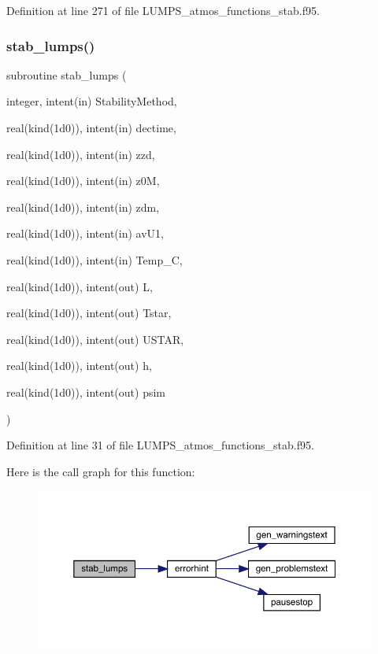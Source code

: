 Definition at line 271 of file L\+U\+M\+P\+S\+\_\+atmos\+\_\+functions\+\_\+stab.\+f95.

\mbox{\label{_l_u_m_p_s__atmos__functions__stab_8f95_a1783dde883ce9c28084bad6ce0af4b7d}} 
\subsubsection{\texorpdfstring{stab\+\_\+lumps()}{stab\_lumps()}}
{\footnotesize\ttfamily subroutine stab\+\_\+lumps (\begin{DoxyParamCaption}\item[{integer, intent(in)}]{Stability\+Method,  }\item[{real(kind(1d0)), intent(in)}]{dectime,  }\item[{real(kind(1d0)), intent(in)}]{zzd,  }\item[{real(kind(1d0)), intent(in)}]{z0M,  }\item[{real(kind(1d0)), intent(in)}]{zdm,  }\item[{real(kind(1d0)), intent(in)}]{av\+U1,  }\item[{real(kind(1d0)), intent(in)}]{Temp\+\_\+C,  }\item[{real(kind(1d0)), intent(out)}]{L,  }\item[{real(kind(1d0)), intent(out)}]{Tstar,  }\item[{real(kind(1d0)), intent(out)}]{U\+S\+T\+AR,  }\item[{real(kind(1d0)), intent(out)}]{h,  }\item[{real(kind(1d0)), intent(out)}]{psim }\end{DoxyParamCaption})}



Definition at line 31 of file L\+U\+M\+P\+S\+\_\+atmos\+\_\+functions\+\_\+stab.\+f95.

Here is the call graph for this function\+:\nopagebreak
\begin{figure}[H]
\begin{center}
\leavevmode
\includegraphics[width=350pt]{_l_u_m_p_s__atmos__functions__stab_8f95_a1783dde883ce9c28084bad6ce0af4b7d_cgraph}
\end{center}
\end{figure}
